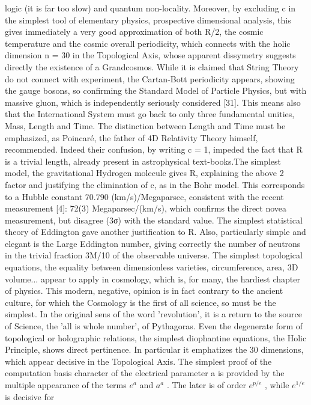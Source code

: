 logic (it is far too slow) and quantum non-locality.
Moreover, by excluding c in the simplest tool of elementary physics, prospective dimensional
analysis, this gives immediately a very good approximation of both R/2, the cosmic temperature
and the cosmic overall periodicity, which connects with the holic dimension n = 30 in the
Topological Axis, whose apparent dissymetry suggests directly the existence of a Grandcosmos.
While it is claimed that String Theory do not connect with experiment, the Cartan-Bott periodicity
appears, showing the gauge bosons, so confirming the Standard Model of Particle Physics, but with
massive gluon, which is independently seriously considered [31].
This means also that the International System must go back to only three fundamental unities,
Mass, Length and Time. The distinction between Length and Time must be emphasized, as
Poincaré, the father of 4D Relativity Theory himself, recommended. Indeed their confusion, by
writing c = 1, impeded the fact that R is a trivial length, already present in astrophysical text-books.The simplest model, the gravitational Hydrogen molecule gives R, explaining the above 2 factor
and justifying the elimination of c, as in the Bohr model. This corresponds to a Hubble constant
70.790 (km/s)/Megaparsec, consistent with the recent measurement [4]: 72(3) Megaparsec/(km/s),
which confirms the direct novea measurement, but disagree (3σ) with the standard value.
The simplest statistical theory of Eddington gave another justification to R. Also, particularly
simple and elegant is the Large Eddington number, giving correctly the number of neutrons in the
trivial fraction 3M/10 of the observable universe.
The simplest topological equations, the equality between dimensionless varieties, circumference,
area, 3D volume... appear to apply in cosmology, which is, for many, the hardiest chapter of
physics. This modern, negative, opinion is in fact contrary to the ancient culture, for which the
Cosmology is the first of all science, so must be the simplest. In the original sens of the word
'revolution', it is a return to the source of Science, the 'all is whole number', of Pythagoras. Even the
degenerate form of topological or holographic relations, the simplest diophantine equations, the
Holic Principle, shows direct pertinence. In particular it emphatizes the 30 dimensions, which
appear decisive in the Topological Axis.
The simplest proof of the computation basis character of the electrical parameter a is provided
by the multiple appearance of the terms $e^{a}$ and $a^{a}$ . The later is of order $e^{p/e}$ , while $e^{1/e}$ is decisive for
